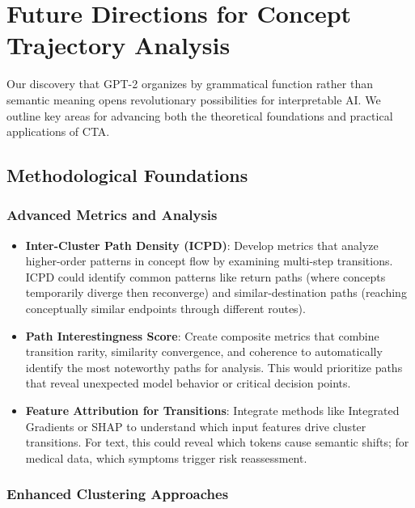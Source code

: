 \section{Future Directions for Concept Trajectory Analysis}

Our discovery that GPT-2 organizes by grammatical function rather than semantic meaning opens revolutionary possibilities for interpretable AI. We outline key areas for advancing both the theoretical foundations and practical applications of CTA.

\subsection{Methodological Foundations}

\subsubsection{Advanced Metrics and Analysis}

\begin{itemize}
    \item \textbf{Inter-Cluster Path Density (ICPD)}: Develop metrics that analyze higher-order patterns in concept flow by examining multi-step transitions. ICPD could identify common patterns like return paths (where concepts temporarily diverge then reconverge) and similar-destination paths (reaching conceptually similar endpoints through different routes).
    
    \item \textbf{Path Interestingness Score}: Create composite metrics that combine transition rarity, similarity convergence, and coherence to automatically identify the most noteworthy paths for analysis. This would prioritize paths that reveal unexpected model behavior or critical decision points.
    
    \item \textbf{Feature Attribution for Transitions}: Integrate methods like Integrated Gradients or SHAP to understand which input features drive cluster transitions. For text, this could reveal which tokens cause semantic shifts; for medical data, which symptoms trigger risk reassessment.
\end{itemize}

\subsubsection{Enhanced Clustering Approaches}

